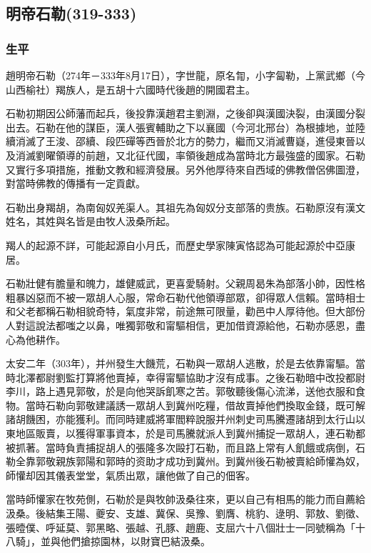 
\subsection{明帝石勒\tiny(319-333)}

\subsubsection{生平}

趙明帝石勒（274年－333年8月17日），字世龍，原名㔨，小字匐勒，上黨武鄉（今山西榆社）羯族人，是五胡十六國時代後趙的開國君主。

石勒初期因公師藩而起兵，後投靠漢趙君主劉淵，之後卻與漢國決裂，由漢國分裂出去。石勒在他的謀臣，漢人張賓輔助之下以襄國（今河北邢台）為根據地，並陸續消滅了王浚、邵續、段匹磾等西晉於北方的勢力，繼而又消滅曹嶷，進侵東晉以及消滅劉曜領導的前趙，又北征代國，率領後趙成為當時北方最強盛的國家。石勒又實行多項措施，推動文教和經濟發展。另外他厚待來自西域的佛教僧侶佛圖澄，對當時佛教的傳播有一定貢獻。

石勒出身羯胡，為南匈奴羌渠人。其祖先為匈奴分支部落的贵族。石勒原沒有漢文姓名，其姓與名皆是由牧人汲桑所起。

羯人的起源不詳，可能起源自小月氏，而歷史學家陳寅恪認為可能起源於中亞康居。

石勒壯健有膽量和魄力，雄健威武，更喜愛騎射。父親周曷朱為部落小帥，因性格粗暴凶惡而不被一眾胡人心服，常命石勒代他領導部眾，卻得眾人信賴。當時相士和父老都稱石勒相貌奇特，氣度非常，前途無可限量，勸邑中人厚待他。但大部份人對這說法都嗤之以鼻，唯獨郭敬和甯驅相信，更加借資源給他，石勒亦感恩，盡心為他耕作。

太安二年（303年），并州發生大饑荒，石勒與一眾胡人逃散，於是去依靠甯驅。當時北澤都尉劉監打算將他賣掉，幸得甯驅協助才沒有成事。之後石勒暗中改投都尉李川，路上遇見郭敬，於是向他哭訴飢寒之苦。郭敬聽後傷心流涕，送他衣服和食物。當時石勒向郭敬建議誘一眾胡人到冀州吃糧，借故賣掉他們換取金錢，既可解諸胡饑困，亦能獲利。而同時建威將軍閻粹說服并州刺史司馬騰遷諸胡到太行山以東地區販賣，以獲得軍事資本，於是司馬騰就派人到冀州捕捉一眾胡人，連石勒都被抓著。當時負責捕捉胡人的張隆多次毆打石勒，而且路上常有人飢餓或病倒，石勒全靠郭敬親族郭陽和郭時的资助才成功到冀州。到冀州後石勒被賣給師懽為奴，師懽却因其儀表堂堂，氣质出眾，讓他做了自己的佃客。

當時師懽家在牧苑側，石勒於是與牧帥汲桑往來，更以自己有相馬的能力而自薦給汲桑。後結集王陽、夔安、支雄、冀保、吳豫、劉膺、桃豹、逯明、郭敖、劉徵、張曀僕、呼延莫、郭黑略、張越、孔豚、趙鹿、支屈六十八個壯士一同號稱為「十八騎」，並與他們搶掠園林，以財寶巴結汲桑。

